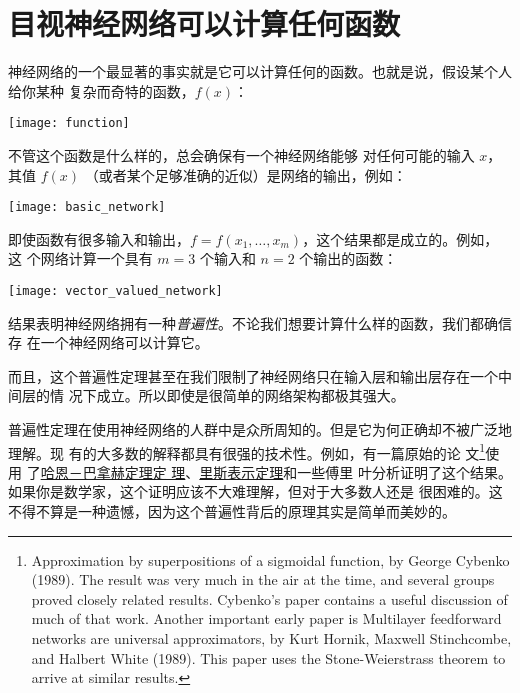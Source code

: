 
\chapter{目视神经网络可以计算任何函数}
\label{ch:VisualProof}

神经网络的一个最显著的事实就是它可以计算任何的函数。也就是说，假设某个人给你某种
复杂而奇特的函数，$f(x)$：
\begin{center}
  \texttt{[image: function]}
\end{center}

\label{basic_network_precursor}不管这个函数是什么样的，总会确保有一个神经网络能够
对任何可能的输入 $x$，其值 $f(x)$ （或者某个足够准确的近似）是网络的输出，例如：
\begin{center}
  \texttt{[image: basic\_network]}
\end{center}

即使函数有很多输入和输出，$f = f(x_1, \ldots, x_m)$，这个结果都是成立的。例如，这
个网络计算一个具有 $m = 3$ 个输入和 $n = 2$ 个输出的函数：
\begin{center}
  \texttt{[image: vector\_valued\_network]}
\end{center}

结果表明神经网络拥有一种\emph{普遍性}。不论我们想要计算什么样的函数，我们都确信存
在一个神经网络可以计算它。

而且，这个普遍性定理甚至在我们限制了神经网络只在输入层和输出层存在一个中间层的情
况下成立。所以即使是很简单的网络架构都极其强大。

普遍性定理在使用神经网络的人群中是众所周知的。但是它为何正确却不被广泛地理解。现
有的大多数的解释都具有很强的技术性。例如，有一篇原始的论
文\footnote{Approximation by superpositions of a sigmoidal function, by George
  Cybenko (1989). The result was very much in the air at the time, and several
  groups proved closely related results. Cybenko's paper contains a useful
  discussion of much of that work. Another important early paper is Multilayer
  feedforward networks are universal approximators, by Kurt Hornik, Maxwell
  Stinchcombe, and Halbert White (1989). This paper uses the Stone-Weierstrass
  theorem to arrive at similar results.}使用
了\href{https://zh.wikipedia.org/wiki/哈恩－巴拿赫定理}{哈恩－巴拿赫定理定
  理}、\href{https://zh.wikipedia.org/wiki/里斯表示定理}{里斯表示定理}和一些傅里
叶分析证明了这个结果。如果你是数学家，这个证明应该不大难理解，但对于大多数人还是
很困难的。这不得不算是一种遗憾，因为这个普遍性背后的原理其实是简单而美妙的。

